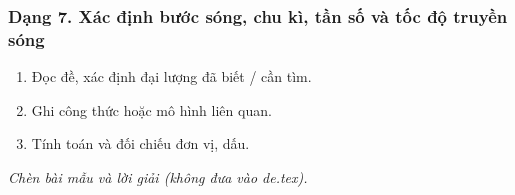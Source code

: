 \subsubsection{Dạng 7. Xác định bước sóng, chu kì, tần số và tốc độ truyền sóng}
\begin{phuongphap}
\begin{enumerate}
\item Đọc đề, xác định đại lượng đã biết / cần tìm.
\item Ghi công thức hoặc mô hình liên quan.
\item Tính toán và đối chiếu đơn vị, dấu.
\end{enumerate}
\end{phuongphap}
\begin{vidumau}
\textit{Chèn bài mẫu và lời giải (không đưa vào de.tex).}
\end{vidumau}

